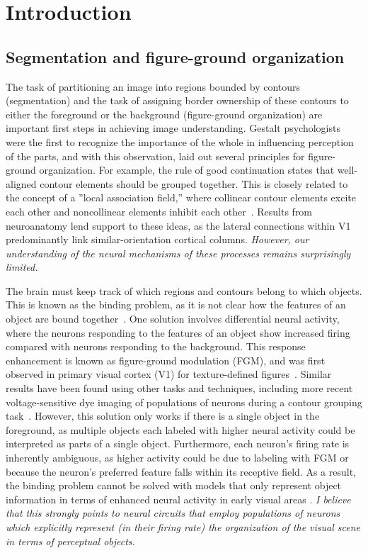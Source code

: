 \chapter{Introduction}
\label{sec:intro}


\section{Segmentation and figure-ground organization}
The task of partitioning an image into regions bounded by contours (segmentation) and the task of assigning border ownership of these contours to either the foreground or the background (figure-ground organization) are important first steps in achieving image understanding. Gestalt psychologists were the first to recognize the importance of the whole in influencing perception of the parts, and with this observation, laid out several principles for figure-ground
organization\citep{Koffka35, Wertheimer23}. For example, the rule of good continuation states that well-aligned contour elements should be grouped together. This is closely related to the concept of a ''local association field,'' where collinear contour elements excite each other and noncollinear elements inhibit each other~\citep{Ullman92, Field_etal93}. Results from neuroanatomy lend support to these ideas, as the lateral connections within V1 predominantly link similar-orientation cortical columns. \textit{However, our
  understanding of the neural mechanisms of these processes remains
  surprisingly limited.}
 
The brain must keep track of which regions and contours belong to which objects. This is known as the binding problem, as it is not clear how the features of an object are bound together~\citep{Treisman96b}. One solution involves differential neural activity, where the neurons responding to the features of an
object show increased firing compared with neurons responding to the
background. This response enhancement is known as figure-ground modulation (FGM), and was first observed in primary visual cortex (V1) for texture-defined figures~\citep{Lamme95}. Similar results have been found using other tasks and techniques, including more recent voltage-sensitive dye imaging of populations of neurons during a contour grouping task~\citep{Gilad_etal13}. However, this solution only works if there is a single object in the foreground, as multiple objects each labeled with higher neural activity could be interpreted as parts of a single object. Furthermore, each neuron's firing rate is inherently ambiguous, as higher activity could be due to labeling with FGM or because the neuron's preferred feature falls within its receptive field. As a result, the binding problem cannot be solved 
with models that only represent object information in terms of enhanced neural activity in early visual areas \citep{Niebur00a}. {\em I believe that this strongly points to neural circuits that employ populations of neurons which explicitly represent (\ie in their firing rate) the organization of the visual scene in terms of perceptual objects.}

